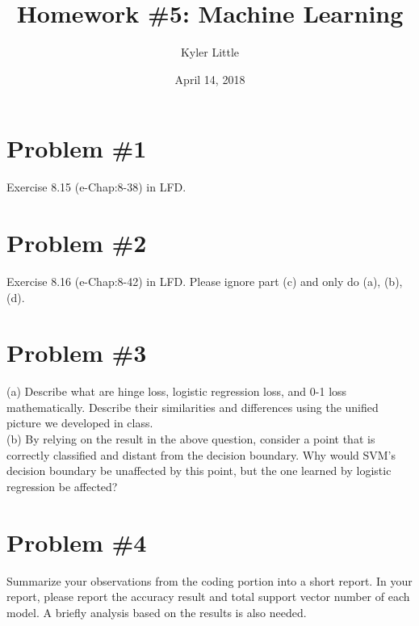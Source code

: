 \documentclass[12pt]{article}
\author{Kyler Little\vspace{-0.6cm}}
\title{Homework \#5: Machine Learning\vspace{-0.3cm}}
\date{April 14, 2018\vspace{-0.7cm}}
\begin{document}
	\maketitle
	\section*{Problem \#1}
	Exercise 8.15 (e-Chap:8-38) in LFD.
	
	\section*{Problem \#2}
	Exercise 8.16 (e-Chap:8-42) in LFD. Please ignore part (c) and only do (a), (b), (d).
		
	\section*{Problem \#3}
	(a) Describe what are hinge loss, logistic regression loss, and 0-1 loss mathematically. Describe their similarities and differences using the unified picture we developed in class. \\
	(b) By relying on the result in the above question, consider a point that is correctly classified and distant from the decision boundary. Why would SVM’s decision boundary be unaffected by this point, but the one learned by logistic regression be affected?
	
	\section*{Problem \#4}
	Summarize your observations from the coding portion into a short report. In your report, please report the accuracy result and total support vector number of each model. A briefly analysis based on the results is also needed.
	
	
\end{document}

